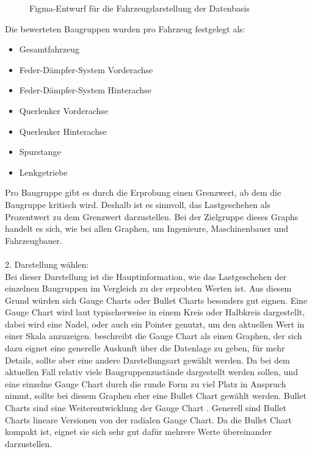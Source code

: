\begin{figure}[h!]
\centering
{}
\caption{Figma-Entwurf für die Fahrzeugdarstellung der Datenbasis}
\label{fig:datenbasis}
\end{figure}
Die bewerteten Baugruppen wurden pro Fahrzeug festgelegt als:
\begin{multicols}{2}
\begin{itemize}
    \item Gesamtfahrzeug
    \item Feder-Dämpfer-System Vorderachse
    \item Feder-Dämpfer-System Hinterachse
    \item Querlenker Vorderachse
    \item Querlenker Hinterachse
    \item Spurstange
    \item Lenkgetriebe
\end{itemize}
\end{multicols}
\noindent
Pro Baugruppe gibt es durch die Erprobung einen Grenzwert, ab dem die Baugruppe kritisch wird. Deshalb ist es sinnvoll, das Lastgeschehen als Prozentwert zu dem Grenzwert darzustellen. Bei der Zielgruppe dieses Graphs handelt es sich, wie bei allen Graphen, um Ingenieure, Maschinenbauer und Fahrzeugbauer. \\\\
2. Darstellung wählen:\\
Bei dieser Darstellung ist die Hauptinformation, wie das Lastgeschehen der einzelnen Baugruppen im Vergleich zu der erprobten Werten ist. Aus diesem Grund würden sich Gauge Charts oder Bullet Charts besonders gut eignen. Eine Gauge Chart wird laut \cite{Schwabish.2021} typischerweise in einem Kreis oder Halbkreis dargestellt, dabei wird eine \glqq Nadel\grqq{}, oder auch ein Pointer genutzt, um den aktuellen Wert in einer Skala anzuzeigen. \cite{Schwabish.2021} beschreibt die Gauge Chart als einen Graphen, der sich dazu eignet eine generelle Auskunft über die Datenlage zu geben, für mehr Details, sollte aber eine andere Darstellungsart gewählt werden. Da bei dem aktuellen Fall relativ viele Baugruppenzustände dargestellt werden sollen, und eine einzelne Gauge Chart durch die runde Form zu viel Platz in Anspruch nimmt, sollte bei diesem Graphen eher eine Bullet Chart gewählt werden. Bullet Charts sind eine Weiterentwicklung der Gauge Chart \cite{Schwabish.2021}. Generell sind Bullet Charts lineare Versionen von der radialen Gauge Chart. Da die Bullet Chart kompakt ist, eignet sie sich sehr gut dafür mehrere Werte übereinander darzustellen. \\\\
